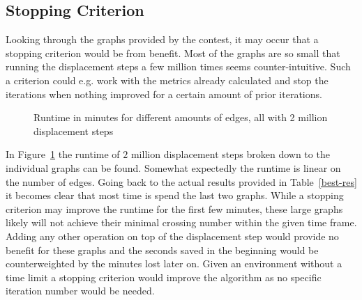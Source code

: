 \documentclass[]{llncs}
\begin{document}
    \subsection{Stopping Criterion}
	Looking through the graphs provided by the contest, it may occur that a stopping criterion would be from benefit. Most of the graphs are so small that running the displacement steps a few million times seems counter-intuitive. Such a criterion could e.g. work with the metrics already calculated and stop the iterations when nothing improved for a certain amount of prior iterations.
	\begin{figure}
	  \centering
	  \label{rtm}
	  \caption{Runtime in minutes for different amounts of edges, all with 2 million displacement steps}
	\end{figure}
In Figure~\ref{rtm} the runtime of $2$ million displacement steps broken down to the individual graphs can be found. Somewhat expectedly the runtime is linear on the number of edges. Going back to the actual results provided in Table~\ref{best-res} it becomes clear that most time is spend the last two graphs. While a stopping criterion may improve the runtime for the first few minutes, these large graphs likely will not achieve their minimal crossing number within the given time frame. Adding any other operation on top of the displacement step would provide no benefit for these graphs and the seconds saved in the beginning would be counterweighted by the minutes lost later on. Given an environment without a time limit a stopping criterion would improve the algorithm as no specific iteration number would be needed.
\end{document}
